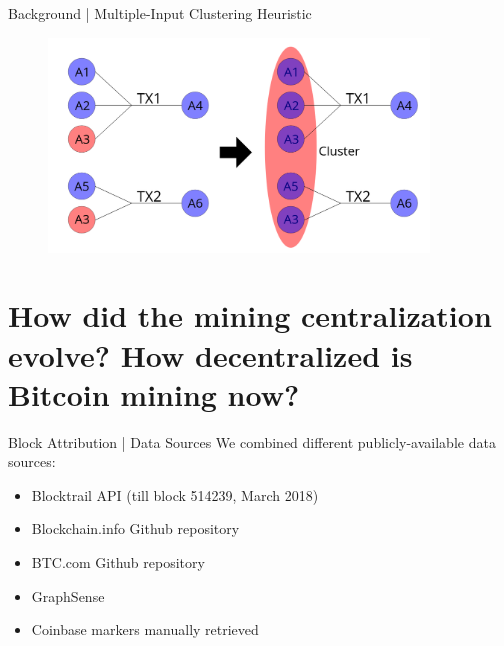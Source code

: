 \documentclass[10pt]{beamer}
\def\firstRQ{How did the mining centralization evolve? How decentralized is Bitcoin mining now?}
\begin{document}
\begin{frame}[fragile]{Background | Multiple-Input Clustering Heuristic}
    \begin{figure}
        \centering
        \includegraphics[width=0.9\textwidth]{images/clustering3.png}
    \end{figure}
    \begin{figure}
        \centering
        \def\svgwidth{\columnwidth}
        
    \end{figure}
\end{frame}

\section{\firstRQ}
\begin{frame}[fragile]{Block Attribution | Data Sources}
    We combined different publicly-available data sources:
    \begin{itemize}
        \item Blocktrail API (till block 514239, March 2018)
        \item Blockchain.info Github repository
        \item BTC.com Github repository
        \item GraphSense
        \item Coinbase markers manually retrieved
    \end{itemize}
\end{frame}
\end{document}
